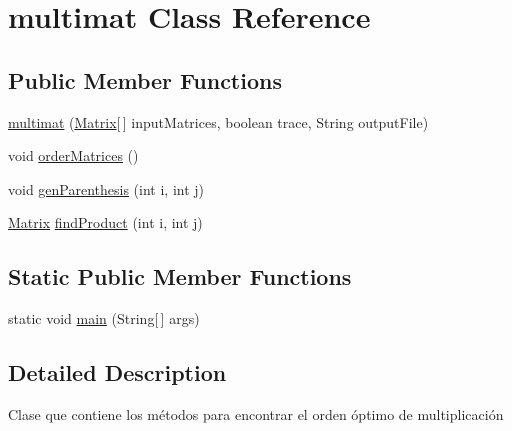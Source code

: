 \hypertarget{classmultimat}{\section{multimat \-Class \-Reference}
\label{dd/dc8/classmultimat}
}
\subsection*{\-Public \-Member \-Functions}
\begin{DoxyCompactItemize}
\item 
\hyperlink{classmultimat_a2c6764a88db29e40ee8e3fcae62624ab}{multimat} (\hyperlink{classMatrix}{\-Matrix}\mbox{[}$\,$\mbox{]} input\-Matrices, boolean trace, \-String output\-File)
\item 
void \hyperlink{classmultimat_aa27b1cb5d03fa9018afdc4a6f97fd083}{order\-Matrices} ()
\item 
void \hyperlink{classmultimat_a31d418c7baa4664d0b2b9aee8a56d0ec}{gen\-Parenthesis} (int i, int j)
\item 
\hyperlink{classMatrix}{\-Matrix} \hyperlink{classmultimat_a2b2afedbe220600fe1b27352124d7469}{find\-Product} (int i, int j)
\end{DoxyCompactItemize}
\subsection*{\-Static \-Public \-Member \-Functions}
\begin{DoxyCompactItemize}
\item 
static void \hyperlink{classmultimat_a0eae78cf845720d17410c4f2389b7401}{main} (\-String\mbox{[}$\,$\mbox{]} args)
\end{DoxyCompactItemize}


\subsection{\-Detailed \-Description}
\-Clase que contiene los métodos para encontrar el orden óptimo de multiplicación 

